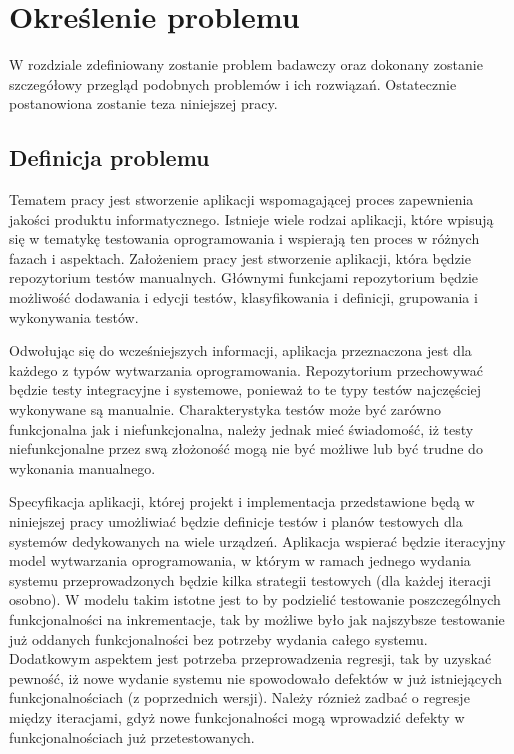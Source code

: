 \chapter{Określenie problemu} 
\label{cha:okreslenie_problemu}

W rozdziale zdefiniowany zostanie problem badawczy oraz dokonany zostanie szczegółowy przegląd  podobnych problemów i ich rozwiązań. Ostatecznie postanowiona zostanie teza niniejszej pracy.

\section{Definicja problemu} 
\label{sec:definicja_problemu}

Tematem pracy jest stworzenie aplikacji wspomagającej proces zapewnienia jakości produktu informatycznego. Istnieje wiele rodzai aplikacji, które wpisują się w tematykę testowania oprogramowania i wspierają ten proces w różnych fazach i aspektach. Założeniem pracy jest stworzenie aplikacji, która będzie repozytorium testów manualnych. Głównymi funkcjami repozytorium będzie możliwość dodawania i edycji testów, klasyfikowania i definicji, grupowania i wykonywania  testów.


Odwołując się do wcześniejszych informacji, aplikacja przeznaczona jest dla każdego z typów wytwarzania oprogramowania. Repozytorium przechowywać będzie testy integracyjne i systemowe, ponieważ to te typy testów najczęściej wykonywane są manualnie. Charakterystyka testów może być zarówno funkcjonalna jak i niefunkcjonalna, należy jednak mieć świadomość, iż testy niefunkcjonalne przez swą złożoność mogą nie być możliwe lub być trudne do wykonania manualnego.

Specyfikacja aplikacji, której projekt i implementacja przedstawione będą w niniejszej pracy umożliwiać będzie definicje testów i planów testowych dla systemów dedykowanych na wiele urządzeń. Aplikacja wspierać będzie iteracyjny model wytwarzania oprogramowania, w którym w ramach jednego wydania systemu przeprowadzonych będzie kilka strategii testowych (dla każdej iteracji osobno). W modelu takim istotne jest to by podzielić testowanie poszczególnych funkcjonalności na inkrementacje, tak by możliwe było jak najszybsze testowanie już oddanych funkcjonalności bez potrzeby wydania całego systemu. Dodatkowym aspektem jest potrzeba przeprowadzenia regresji, tak by uzyskać pewność, iż nowe wydanie systemu nie spowodowało defektów w już istniejących funkcjonalnościach (z poprzednich wersji). Należy róznież zadbać o regresje między iteracjami, gdyż nowe funkcjonalności mogą wprowadzić defekty w funkcjonalnościach już przetestowanych.
\newpage

